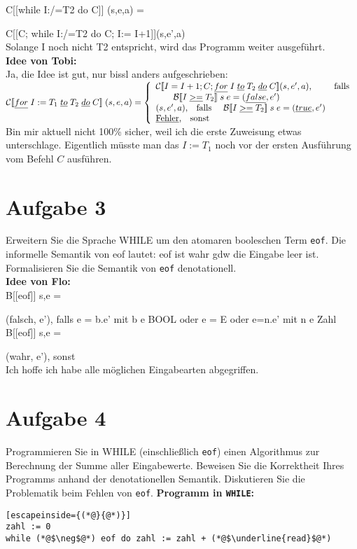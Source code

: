 \documentclass[ngerman,a4paper]{report}
\begin{document}
C[[while I:/=T2 do C]] (s,e,a) = { C[[C; while I:/=T2 do C; I:= I+1]](s,e',a)\\

Solange I noch nicht T2 entspricht, wird das Programm weiter ausgeführt.\\

\textbf{Idee von Tobi:}\\
Ja, die Idee ist gut, nur bissl anders aufgeschrieben:\\
$		\mathcal{C}
[\![\underline{for}\;I:=T_1\;\underline{to}\;T_2\;\underline{do}\;C]\!]\;(s,e,a) = \left\lbrace\begin{array}{l l} \mathcal{C}
[\![I=I+1;C;\underline{for}\;I\;\underline{to}\;T_2\;\underline{do}\;C]\!](s,e',a)\text{,}&\text{falls }\\\quad\quad\mathcal{B}
[\![I\;\underline{>=}\;T_2]\!]\;s\;e= (\underline{false},e')\\
(s,e',a)\text{,}\quad\text{falls }\quad\mathcal{B}[\![I\;\underline{>=}\;T_2]\!]\;s\;e= (\underline{true},e')\\
		\underline{\text{Fehler}}\text{,}\quad\text{sonst} \end{array}\right.$\\
Bin mir aktuell nicht 100\% sicher, weil ich die erste Zuweisung etwas unterschlage. Eigentlich müsste man das $I:=T_1$ noch vor der ersten Ausführung vom Befehl $C$ ausführen.\\

\section*{Aufgabe 3}
Erweitern Sie die Sprache WHILE um den atomaren booleschen Term \lstinline!eof!. Die informelle Semantik von eof lautet: eof ist wahr gdw die Eingabe leer ist.\\
Formalisieren Sie die Semantik von \lstinline!eof! denotationell.\\

\textbf{Idee von Flo:}\\

B[[eof]] s,e = { (falsch, e'), falls e = b.e' mit b e BOOL oder e = E oder e=n.e' mit n e Zahl\\
B[[eof]] s,e = { (wahr, e'), sonst\\

Ich hoffe ich habe alle möglichen Eingabearten abgegriffen.
\section*{Aufgabe 4}
Programmieren Sie in WHILE (einschließlich \lstinline!eof!) einen Algorithmus zur Berechnung der Summe aller Eingabewerte. Beweisen Sie die Korrektheit Ihres Programms anhand der denotationellen Semantik. Diskutieren Sie die Problematik beim Fehlen von \lstinline!eof!.
\textbf{Programm in \texttt{WHILE}:}\\
\begin{lstlisting}[escapeinside={(*@}{@*)}]
zahl := 0
while (*@$\neg$@*) eof do zahl := zahl + (*@$\underline{read}$@*)
\end{lstlisting}

}}}
\end{document}
